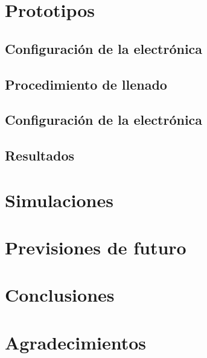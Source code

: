 \documentclass[11pt,a4paper]{article}
\begin{document}
\newpage
\section{Prototipos} \label{sec:ch04}

	\subsection{Configuración de la electrónica}
	
	
	\subsection{Procedimiento de llenado}
	
	
	\subsection{Configuración de la electrónica}
	
	
	\subsection{Resultados}
	

\newpage
\section{Simulaciones} \label{sec:ch04}


\newpage
\section{Previsiones de futuro} \label{sec:ch04}


\newpage
\section{Conclusiones} \label{sec:conclusions}


\section{Agradecimientos} \label{sec:acknowledgment}



\end{document}

